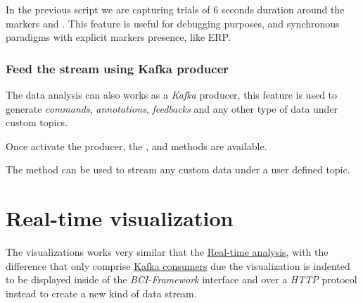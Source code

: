 

In the previous script we are capturing trials of 6 seconds duration around the markers  and . This feature is useful for debugging purposes, and synchronous paradigms with explicit markers presence, like \gls*{ERP}.


\subsubsection{Feed the stream using Kafka producer}

The data analysis can also works as a \textit{Kafka} producer, this feature is used to generate \textit{commands}, \textit{annotations}, \textit{feedbacks} and any other type of data under custom topics.



Once activate the producer, the ,  and  methods are available.



The  method can be used to stream any custom data under a user defined topic. 



\section{Real-time visualization}  %

The visualizations works very similar that the \hyperref[ch4:rt_data_analysis]{Real-time analysis}, with the difference that only comprise \hyperref[]{Kafka consumers} due the visualization is indented to be displayed inside of the \textit{BCI-Framework} interface and over a \textit{HTTP} protocol instead to create a new kind of data stream. 

